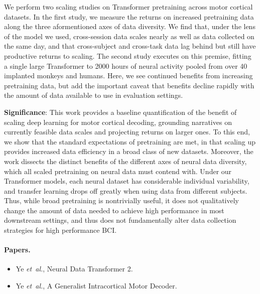\documentclass[12pt,oneside]{report}
\DeclareRobustCommand{\etal}{\emph{et~al.}\xspace}
\begin{document}
We perform two scaling studies on Transformer pretraining across motor cortical datasets. In the first study, we measure the returns on increased pretraining data along the three aformentioned axes of data diversity. We find that, under the lens of the model we used, cross-session data scales nearly as well as data collected on the same day, and that cross-subject and cross-task data lag behind but still have productive returns to scaling. The second study executes on this premise, fitting a single large Transformer to 2000 hours of neural activity pooled from over 40 implanted monkeys and humans. Here, we see continued benefits from increasing pretraining data, but add the important caveat that benefits decline rapidly with the amount of data available to use in evaluation settings.

\textbf{Significance}: This work provides a baseline quantification of the benefit of scaling deep learning for motor cortical decoding, grounding narratives on currently feasible data scales and projecting returns on larger ones. To this end, we show that the standard expectations of pretraining are met, in that scaling up provides increased data efficiency in a broad class of new datasets. Moreover, the work dissects the distinct benefits of the different axes of neural data diversity, which all scaled pretraining on neural data must contend with. Under our Transformer models, each neural dataset has considerable individual variability, and transfer learning drops off greatly when using data from different subjects. Thus, while broad pretraining is nontrivially useful, it does not qualitatively change the amount of data needed to achieve high performance in most downstream settings, and thus does not fundamentally alter data collection strategies for high performance BCI.

\paragraph{Papers.}
\begin{itemize}
  \item Ye \etal, Neural Data Transformer 2.
  \item Ye \etal, A Generalist Intracortical Motor Decoder.
\end{itemize}
\end{document}
